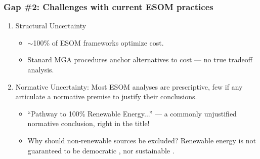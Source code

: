 \begin{frame}
    \frametitle{Gap \#2: Challenges with current ESOM practices}

    \begin{enumerate}
        \item Structural Uncertainty
        \begin{itemize}
            \item $\sim$100\% of ESOM frameworks optimize cost.
            \item Stanard MGA procedures anchor alternatives to cost --- no true
            tradeoff analysis.
        \end{itemize}
        \item Normative Uncertainty: Most ESOM analyses are prescriptive, few if
        any articulate a normative premise to justify their conclusions.
        \begin{itemize}
            \item ``Pathway to 100\% Renewable Energy...'' --- a commonly
            unjustified normative conclusion, right in the title!
            \item Why should non-renewable sources be excluded? Renewable energy
            is not guaranteed to be democratic \cite{winner_artifacts_1980}, nor
            sustainable \cite{bell_toward_2020}.
        \end{itemize}
    \end{enumerate}

\end{frame}